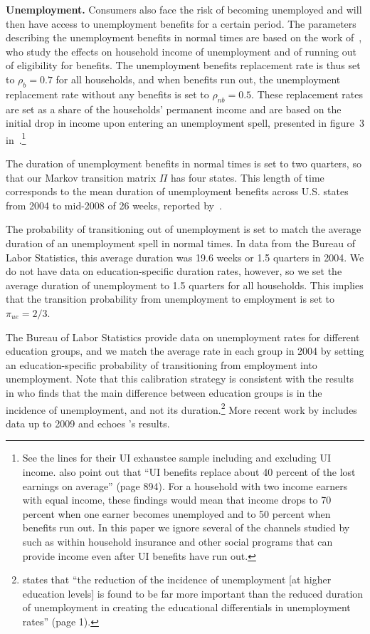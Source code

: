 \documentclass[\PathToRoot/\ProjectName]{subfiles}
\begin{document}
\textbf{Unemployment.} Consumers also face the risk of becoming unemployed and will then have access to unemployment benefits for a certain period.
The parameters describing the unemployment benefits in normal times are based on the work of~\cite{rothstein2017scraping}, who study the effects on household income of unemployment and of running out of eligibility for benefits.
The unemployment benefits replacement rate is thus set to $\rho_b=0.7$ for all households, and when benefits run out, the unemployment replacement rate without any benefits is set to $\rho_{nb}=0.5$.
These replacement rates are set as a share of the households' permanent income and are based on the initial drop in income upon entering an unemployment spell, presented in figure~3 in~\cite{rothstein2017scraping}.\footnote{See the lines for their UI exhaustee sample including and excluding UI income.
  \cite{rothstein2017scraping} also point out that ``UI benefits replace about 40 percent of the lost earnings on average'' (page 894).
  For a household with two income earners with equal income, these findings would mean that income drops to 70 percent when one earner becomes unemployed and to 50 percent when benefits run out.
  In this paper we ignore several of the channels studied by~\cite{rothstein2017scraping} such as within household insurance and other social programs that can provide income even after UI benefits have run out.}

The duration of unemployment benefits in normal times is set to two quarters, so that our Markov transition matrix $\Pi$ has four states.
This length of time corresponds to the mean duration of unemployment benefits across U.S.
states from 2004 to mid-2008 of 26 weeks, reported by~\cite{rothstein2017scraping}.

The probability of transitioning out of unemployment is set to match the average duration of an unemployment spell in normal times.
In data from the Bureau of Labor Statistics, this average duration was 19.6 weeks or 1.5 quarters in 2004. We do not have data on  education-specific duration rates, however, so we set the average duration of unemployment to 1.5 quarters for all households. This implies that the transition probability from unemployment to employment is set to $\pi_{ue}=2/3$.

The Bureau of Labor Statistics provide data on unemployment rates for different education groups, and we match the average rate in each group in 2004 by setting an education-specific probability of transitioning from employment into unemployment.
Note that this calibration strategy is consistent with the results in \cite{mincer1991education} who finds that the main difference between education groups is in the incidence of unemployment, and not its duration.\footnote{\cite{mincer1991education} states that ``the reduction of the incidence of unemployment [at higher education levels] is found to be far more important than the reduced duration of unemployment in creating the educational differentials in unemployment rates'' (page 1).} More recent work by \cite{elsby2010labor} includes data up to 2009 and echoes \citeauthor{mincer1991education}'s results.
\end{document}
